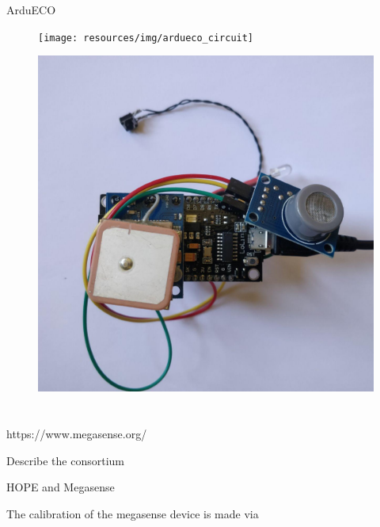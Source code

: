 ArduECO

\begin{figure}
	\centering
	\texttt{[image: resources/img/ardueco\_circuit]}
	\caption{}
\end{figure}

\begin{figure}
	\centering
	\includegraphics[width=.5\textwidth]{resources/img/ardueco_picture}
	\caption{}
\end{figure}

\section{\megasense}\label{sec:megasense}


https://www.megasense.org/

Describe the consortium

HOPE and Megasense

The calibration of the megasense device is made via